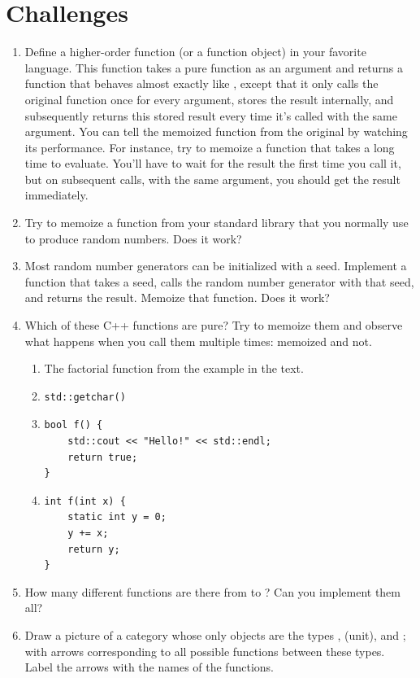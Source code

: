 \section{Challenges}

\begin{enumerate}
\tightlist
\item
  Define a higher-order function (or a function object) 
  in your favorite language. This function takes a pure function
   as an argument and returns a function that behaves almost
  exactly like , except that it only calls the original
  function once for every argument, stores the result internally, and
  subsequently returns this stored result every time it's called with
  the same argument. You can tell the memoized function from the
  original by watching its performance. For instance, try to memoize a
  function that takes a long time to evaluate. You'll have to wait for
  the result the first time you call it, but on subsequent calls, with
  the same argument, you should get the result immediately.
\item
  Try to memoize a function from your standard library that you normally
  use to produce random numbers. Does it work?
\item
  Most random number generators can be initialized with a seed.
  Implement a function that takes a seed, calls the random number
  generator with that seed, and returns the result. Memoize that
  function. Does it work?
\item
  Which of these C++ functions are pure? Try to memoize them and observe
  what happens when you call them multiple times: memoized and not.

  \begin{enumerate}
  \tightlist
  \item
    The factorial function from the example in the text.
  \item
\begin{verbatim}
std::getchar()
\end{verbatim}
  \item
\begin{verbatim}
bool f() {
    std::cout << "Hello!" << std::endl;
    return true;
}
\end{verbatim}
  \item
\begin{verbatim}
int f(int x) {
    static int y = 0;
    y += x;
    return y;
}
\end{verbatim}
  \end{enumerate}
\item
  How many different functions are there from  to
  ? Can you implement them all?
\item
  Draw a picture of a category whose only objects are the types
  , \code{()} (unit), and ; with arrows
  corresponding to all possible functions between these types. Label the
  arrows with the names of the functions.
\end{enumerate}